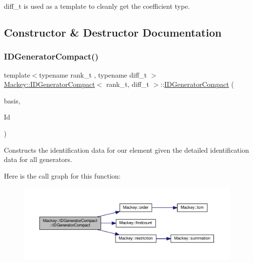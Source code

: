 diff\+\_\+t is used as a template to cleanly get the coefficient type. 

\subsection{Constructor \& Destructor Documentation}
\mbox{\label{classMackey_1_1IDGeneratorCompact_a26a4b6a1cf1ec6be1e63fdecaf142b66}} 
\subsubsection{\texorpdfstring{I\+D\+Generator\+Compact()}{IDGeneratorCompact()}}
{\footnotesize\ttfamily template$<$typename rank\+\_\+t , typename diff\+\_\+t $>$ \\
\hyperlink{classMackey_1_1IDGeneratorCompact}{Mackey\+::\+I\+D\+Generator\+Compact}$<$ rank\+\_\+t, diff\+\_\+t $>$\+::\hyperlink{classMackey_1_1IDGeneratorCompact}{I\+D\+Generator\+Compact} (\begin{DoxyParamCaption}\item[{const rank\+\_\+t \&}]{basis,  }\item[{const \hyperlink{classMackey_1_1IDGenerators}{I\+D\+Generators}$<$ rank\+\_\+t, diff\+\_\+t $>$ \&}]{Id }\end{DoxyParamCaption})}



Constructs the identification data for our element given the detailed identification data for all generators. 

Here is the call graph for this function\+:\nopagebreak
\begin{figure}[H]
\begin{center}
\leavevmode
\includegraphics[width=350pt]{classMackey_1_1IDGeneratorCompact_a26a4b6a1cf1ec6be1e63fdecaf142b66_cgraph}
\end{center}
\end{figure}



